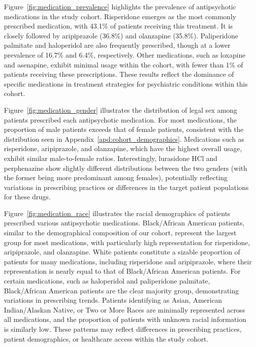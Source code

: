 Figure~\ref{fig:medication_prevalence} highlights the prevalence of antipsychotic medications in the study cohort. 
Risperidone emerges as the most commonly prescribed medication, with 43.1\% of patients receiving this treatment. 
It is closely followed by aripiprazole (36.8\%) and olanzapine (35.8\%). 
Paliperidone palmitate and haloperidol are also frequently prescribed, though at a lower prevalence of 16.7\% and 6.4\%, respectively. 
Other medications, such as loxapine and asenapine, exhibit minimal usage within the cohort, with fewer than 1\% of patients receiving these prescriptions. 
These results reflect the dominance of specific medications in treatment strategies for psychiatric conditions within this cohort.

Figure~\ref{fig:medication_gender} illustrates the distribution of legal sex among patients prescribed each antipsychotic medication. 
For most medications, the proportion of male patients exceeds that of female patients, consistent with the distribution seen in Appendix~\ref{apd:cohort_demographics}. 
Medications such as risperidone, aripiprazole, and olanzapine, which have the highest overall usage, exhibit similar male-to-female ratios. 
Interestingly, lurasidone HCl and perphenazine show slightly different distributions between the two genders (with the former being more predominant among females), potentially reflecting variations in prescribing practices or differences in the target patient populations for these drugs.

Figure~\ref{fig:medication_race} illustrates the racial demographics of patients prescribed various antipsychotic medications.
Black/African American patients, similar to the demographical composition of our cohort, represent the largest group for most medications, with particularly high representation for risperidone, aripiprazole, and olanzapine.
White patients constitute a sizable proportion of patients for many medications, including risperidone and aripiprazole, where their representation is nearly equal to that of Black/African American patients.
For certain medications, such as haloperidol and paliperidone palmitate, Black/African American patients are the clear majority group, demonstrating variations in prescribing trends.
Patients identifying as Asian, American Indian/Alaskan Native, or Two or More Races are minimally represented across all medications, and the proportion of patients with unknown racial information is similarly low.
These patterns may reflect differences in prescribing practices, patient demographics, or healthcare access within the study cohort.


